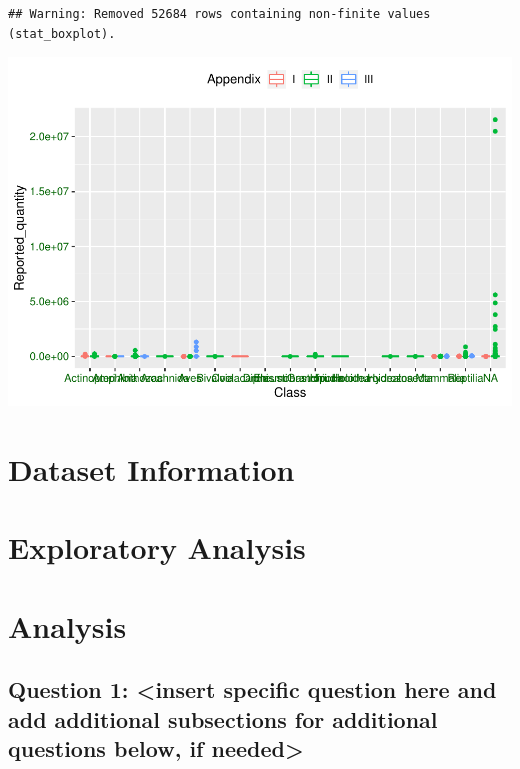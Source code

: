 \documentclass[
  12pt,
]{article}
\begin{document}
\begin{verbatim}
## Warning: Removed 52684 rows containing non-finite values (stat_boxplot).
\end{verbatim}

\includegraphics{Wood_ENV872_Project_files/figure-latex/unnamed-chunk-5-1.pdf}

\newpage

\hypertarget{dataset-information}{%
\section{Dataset Information}\label{dataset-information}}

\newpage

\hypertarget{exploratory-analysis}{%
\section{Exploratory Analysis}\label{exploratory-analysis}}

\newpage

\hypertarget{analysis}{%
\section{Analysis}\label{analysis}}

\hypertarget{question-1-insert-specific-question-here-and-add-additional-subsections-for-additional-questions-below-if-needed}{%
\subsection{Question 1: \textless insert specific question here and add
additional subsections for additional questions below, if
needed\textgreater{}}\label{question-1-insert-specific-question-here-and-add-additional-subsections-for-additional-questions-below-if-needed}}
\end{document}
